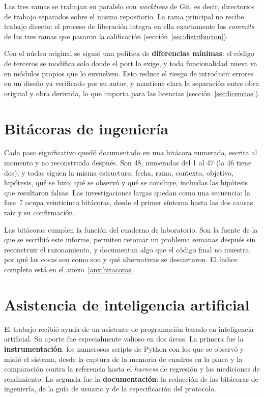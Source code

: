 Las tres ramas se trabajan en paralelo con \emph{worktrees} de Git, es decir,
directorios de trabajo separados sobre el mismo repositorio. La rama
principal no recibe trabajo directo: el proceso de liberación integra en
ella exactamente los \emph{commits} de las tres ramas que pasaron la
calificación (sección~\ref{sec:distribucion}).

Con el núcleo original se siguió una política de \textbf{diferencias
mínimas}: el código de terceros se modifica solo donde el port lo exige, y
toda funcionalidad nueva va en módulos propios que lo envuelven. Esto reduce
el riesgo de introducir errores en un diseño ya verificado por su autor, y
mantiene clara la separación entre obra original y obra derivada, lo que
importa para las licencias (sección~\ref{sec:licencias}).

\section{Bitácoras de ingeniería}
\label{sec:bitacoras}

Cada paso significativo quedó documentado en una bitácora numerada, escrita
al momento y no reconstruida después. Son 48, numeradas del 1 al 47 (la 46 tiene dos), y todas siguen la misma
estructura: fecha, rama, contexto, objetivo, hipótesis, qué se hizo, qué se
observó y qué se concluye, incluidas las hipótesis que resultaron falsas. Las
investigaciones largas quedan como una secuencia: la fase~7 ocupa veinticinco
bitácoras, desde el primer síntoma hasta las dos causas raíz y su
confirmación.

Las bitácoras cumplen la función del cuaderno de laboratorio. Son la fuente
de la que se escribió este informe, permiten retomar un problema semanas
después sin reconstruir el razonamiento, y documentan algo que el código
final no muestra: por qué las cosas son como son y qué alternativas se
descartaron. El índice completo está en el anexo~\ref{anx:bitacoras}.

\section{Asistencia de inteligencia artificial}
\label{sec:asistente-ia}

El trabajo recibió ayuda de un asistente de programación basado en
inteligencia artificial. Su aporte fue especialmente valioso en dos áreas. La
primera fue la \textbf{instrumentación}: los numerosos scripts de Python con
los que se observó y midió el sistema, desde la captura de la memoria de
cuadros en la placa y la comparación contra la referencia hasta el
\emph{harness} de regresión y las mediciones de rendimiento. La segunda fue la
\textbf{documentación}: la redacción de las bitácoras de ingeniería, de la
guía de usuario y de la especificación del protocolo.

